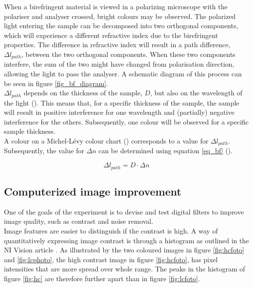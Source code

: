When a birefringent material is viewed in a polarizing microscope with the polariser and analyser crossed, bright colours may be observed. The polarized light entering the sample can be decomposed into two orthogonal components, which will experience a different refractive index due to the birefringent properties. The difference in refractive index will result in a path difference, $\Delta l_{path}$, between the two orthogonal components. When these two components interfere, the sum of the two might have changed from polarisation direction, allowing the light to pass the analyser. A schematic diagram of this process can be seen in figure \ref{fig_bf_diagram}. \\
$\Delta l_{path}$ depends on the thickness of the sample, $D$, but also on the wavelength of the light (\cite{hecht}). This means that, for a specific thickness of the sample, the sample will result in positive interference for one wavelength and (partially) negative interference for the others. Subsequently, one colour will be observed for a specific sample thickness.\\
A colour on a Michel-L\'evy colour chart (\cite{bf_chart}) corresponds to a value for $\Delta l_{path}$. Subsequently, the value for $\Delta n$ can be determined using equation \eqref{eq_bf} (\cite{hecht}).  

\begin{equation}
	\label{eq_bf}
	\Delta l_{path} = D \cdot \Delta n
\end{equation}
	



\subsection{Computerized image improvement}
One of the goals of the experiment is to devise and test digital filters to improve image quality, such as contrast and noise removal.\\
Image features are easier to distinguish if the contrast is high. A way of quantitatively expressing image contrast is through a histogram as outlined in the NI Vision article \cite{histogram_theory}. As illustrated by the two coloured images in figure \ref{fig:hcfoto} and \ref{fig:lcphoto}, the high contrast image in figure \ref{fig:hcfoto}, has pixel intensities that are more spread over whole range. The peaks in the histogram of figure \ref{fig:hc} are therefore further apart than in figure \ref{fig:lcfoto}.

